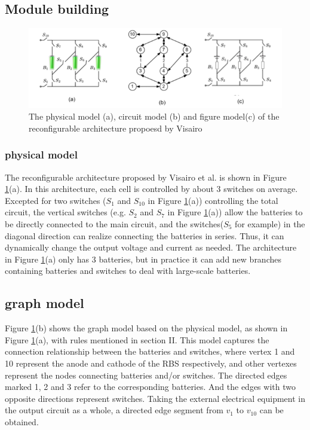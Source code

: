 \documentclass{article}
\begin{document}
\subsection{Module building}

\begin{figure}
    \centering
    \includegraphics[width=\textwidth]{../attachments/fig2.png}
    \caption{The physical model (a), circuit model (b) and figure model(c) of the reconfigurable architecture propoesd by Visairo \cite{visairoReconfigurableBatteryPack2008}}
    \label{fig:2}
\end{figure}

\subsubsection{physical model}

The reconfigurable architecture proposed by Visairo et al.\cite{visairoReconfigurableBatteryPack2008} is shown in Figure \ref{fig:2}(a).
In this architecture, each cell is controlled by about 3 switches on average.
Excepted for two switches ($S_1$ and $S_10$ in Figure \ref{fig:2}(a)) controlling the total circuit, the vertical switches (e.g. $S_2$ and $S_7$ in Figure \ref{fig:2}(a)) allow the batteries to be directly connected to the main circuit, and the switches($S_5$ for example) in the diagonal direction can realize connecting the batteries in series.
Thus, it can dynamically change the output voltage and current as needed.
The architecture in Figure \ref{fig:2}(a) only has 3 batteries, but in practice it can add new branches containing batteries and switches to deal with large-scale batteries.

\subsection{graph model}

Figure \ref{fig:2}(b) shows the graph model based on the physical model, as shown in Figure \ref{fig:2}(a), with rules mentioned in section II.
This model captures the connection relationship between the batteries and switches, where vertex 1 and 10 represent the anode and cathode of the RBS respectively, and other vertexes represent the nodes connecting batteries and/or switches.
The directed edges marked 1, 2 and 3 refer to the corresponding batteries.
And the edges with two opposite directions represent switches.
Taking the external electrical equipment in the output circuit as a whole, a directed edge segment from $v_1$ to $v_{10}$ can be obtained. 
\end{document}
